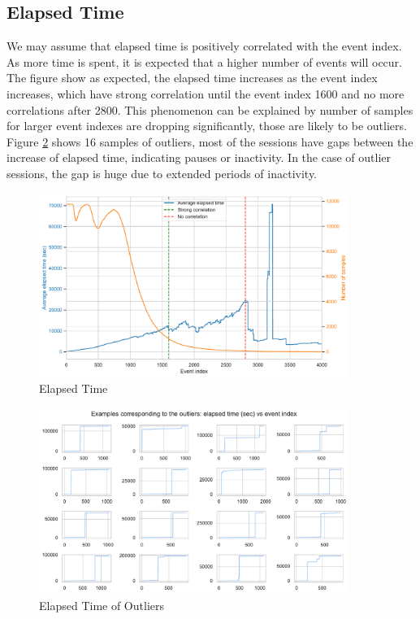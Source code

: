 \documentclass[11pt,a4paper]{article}
\begin{document}
    \subsection{Elapsed Time}
    We may assume that elapsed time is positively correlated with the event index. As more time is spent, it is expected that a higher number of events will occur. \\
    The figure show as expected, the elapsed time increases as the event index increases, which have strong correlation until the event index 1600 and no more correlations after 2800. This phenomenon can be explained by number of samples for larger event indexes are dropping significantly, those are likely to be outliers. Figure \ref{fig:elapsed_time_outlier} shows 16 samples of outliers, most of the sessions have gaps between the increase of elapsed time, indicating pauses or inactivity. In the case of outlier sessions, the gap is huge due to extended periods of inactivity.
    \begin{figure}[H]
        \centering
        \includegraphics[width = 0.9\textwidth]{EDA_plot/elapsed_time.pdf}
        \caption{Elapsed Time}
        \label{fig:elapsed_time}
    \end{figure}
    \begin{figure}[H]
        \centering
        \includegraphics[width = 0.9\textwidth]{EDA_plot/elapsed_time_outliers.pdf}
        \caption{Elapsed Time of Outliers}
        \label{fig:elapsed_time_outlier}
    \end{figure}
\end{document}
